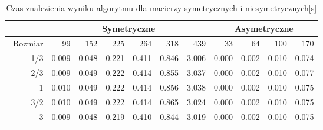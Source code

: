 \begin{table}
\centering
\begin{tabular}{|r|r|r|r|r|r|r|r|r|r|r|}
\hline
 & \multicolumn{6}{|c|}{Symetryczne} & \multicolumn{4}{|c|}{Asymetryczne} \\ \hline\
Rozmiar & 99 & 152 & 225 & 264 & 318 & 439 & 33 & 64 & 100 & 170 \\ \hline
1/3 & 0.009 & 0.048 & 0.221 & 0.411 & 0.846 & 3.006 & 0.000 & 0.002 & 0.010 & 0.074 \\
2/3 & 0.009 & 0.049 & 0.222 & 0.414 & 0.855 & 3.037 & 0.000 & 0.002 & 0.010 & 0.077 \\
1 & 0.010 & 0.049 & 0.222 & 0.414 & 0.856 & 3.038 & 0.000 & 0.002 & 0.010 & 0.075 \\
3/2 & 0.010 & 0.049 & 0.222 & 0.414 & 0.865 & 3.024 & 0.000 & 0.002 & 0.010 & 0.075 \\
3 & 0.009 & 0.048 & 0.219 & 0.410 & 0.844 & 3.019 & 0.000 & 0.002 & 0.010 & 0.075 \\ \hline
\end{tabular}
\caption{Czas znalezienia wyniku algorytmu dla macierzy symetrycznych i niesymetrycznych[s]}
\label{tab:time_AoAB}
\end{table}
